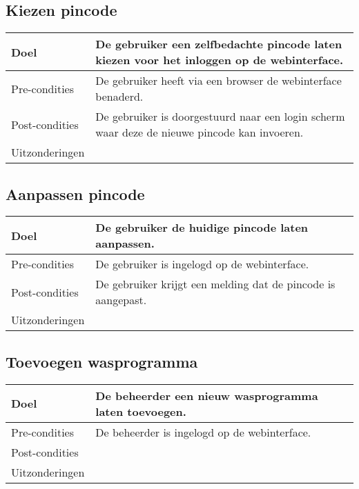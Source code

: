 \subsection{Kiezen pincode}
\begin{center}
  \begin{tabular}{ | p{4cm} | p{8.5cm} | }    \hline
    Doel & De gebruiker een zelfbedachte pincode laten kiezen voor het inloggen op de webinterface. \\ \hline
    Pre-condities & De gebruiker heeft via een browser de webinterface benaderd. \\ \hline
    Post-condities & De gebruiker is doorgestuurd naar een login scherm waar deze de nieuwe pincode kan invoeren. \\ \hline
    Uitzonderingen &  \\
    \hline
  \end{tabular}
\end{center}

\subsection{Aanpassen pincode}
\begin{center}
  \begin{tabular}{ | p{4cm} | p{8.5cm} | }    \hline
    Doel & De gebruiker de huidige pincode laten aanpassen. \\ \hline
    Pre-condities & De gebruiker is ingelogd op de webinterface. \\ \hline
    Post-condities & De gebruiker krijgt een melding dat de pincode is aangepast. \\ \hline
	Uitzonderingen &  \\
    \hline
  \end{tabular}
\end{center}

\subsection{Toevoegen wasprogramma}
\begin{center}
  \begin{tabular}{ | p{4cm} | p{8.5cm} | }    \hline
    Doel & De beheerder een nieuw wasprogramma laten toevoegen. \\ \hline
    Pre-condities & De beheerder is ingelogd op de webinterface. \\ \hline
    Post-condities & \\ \hline
	Uitzonderingen &  \\
    \hline
  \end{tabular}
\end{center}